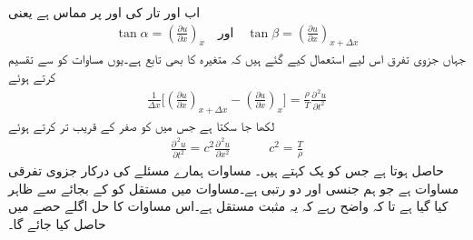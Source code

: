 اب  اور  تار کی  اور  پر مماس ہے یعنی
\begin{align*}
\tan \alpha=\left(\frac{\partial u}{\partial x}\right)_x \quad \text{اور} \quad \tan \beta=\left(\frac{\partial u}{\partial x}\right)_{x+\Delta x}
\end{align*}
جہاں جزوی تفرق اس لیے استعمال کیے  گئے ہیں کہ  متغیرہ  کا بھی تابع  ہے۔یوں مساوات  کو  سے تقسیم کرتے ہوئے
\begin{align*}
\frac{1}{\Delta x}\big[\left(\frac{\partial u}{\partial x}\right)_{x+\Delta x}-\left(\frac{\partial u}{\partial x}\right)_{x}\big]=\frac{\rho}{T}\frac{\partial^{\,2}u}{\partial t^2}
\end{align*}
لکھا جا سکتا ہے جس میں  کو صفر کے قریب تر کرتے ہوئے
\begin{align}\label{مساوات_جزوی_تار_ت}
\frac{\partial^{\,2}u}{\partial t^2}=c^2\frac{\partial^{\,2}u}{\partial x^2}\quad \quad \quad c^2=\frac{T}{\rho}
\end{align}
حاصل ہوتا ہے جس کو یک  کہتے ہیں۔ مساوات  ہمارے مسئلے کی درکار جزوی تفرقی مساوات ہے جو ہم جنسی اور دو رتبی ہے۔مساوات میں مستقل  کو  کے بجائے  سے ظاہر کیا گیا ہے تا کہ واضح رہے کہ یہ مثبت مستقل ہے۔اس مساوات کا حل اگلے حصے میں حاصل کیا جائے گا۔

